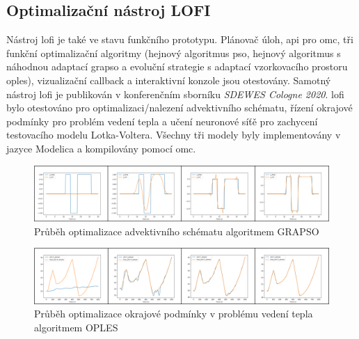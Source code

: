 \subsection{Optimalizační nástroj LOFI}
Nástroj \acrshort{lofi} je také ve stavu funkčního prototypu. Plánovač úloh,
\acrshort{api} pro \acrshort{omc}, tři funkční optimalizační algoritmy (hejnový
algoritmus \acrshort{pso}, hejnový algoritmus s náhodnou adaptací
\acrshort{grapso} a evoluční strategie s adaptací vzorkovacího prostoru
\acrshort{oples}), vizualizační callback a interaktivní konzole jsou otestovány.
Samotný nástroj \acrshort{lofi} je publikován v konferenčním sborníku
\textit{SDEWES Cologne 2020}. \acrshort{lofi} bylo otestováno pro
optimalizaci/nalezení advektivního schématu, řízení okrajové podmínky pro
problém vedení tepla a učení neuronové síťě pro zachycení testovacího modelu
Lotka-Voltera. Všechny tři modely byly implementovány v jazyce Modelica a
kompilovány pomocí \acrshort{omc}.
\begin{figure}[h]
\begin{center}
  \includegraphics[width=\textwidth]{figures/Advection_GRAPSO}
\end{center}
\caption{Průběh optimalizace advektivního schématu algoritmem GRAPSO}
\label{fig:Advection_GRAPSO}
\end{figure}
\begin{figure}[h]
\begin{center}
  \includegraphics[width=\textwidth]{figures/Inverse_OPLES}
\end{center}
\caption{Průběh optimalizace okrajové podmínky v problému vedení tepla
algoritmem OPLES}
\label{fig:Inverse_OPLES}
\end{figure}
